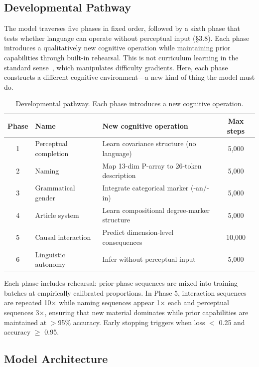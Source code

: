 \documentclass{article}
\begin{document}
\subsection{Developmental Pathway}

The model traverses five phases in fixed order, followed by a sixth phase that tests whether language can operate without perceptual input (\S3.8). Each phase introduces a qualitatively new cognitive operation while maintaining prior capabilities through built-in rehearsal. This is not curriculum learning in the standard sense~\cite{bengio2009}, which manipulates difficulty gradients. Here, each phase constructs a different cognitive environment---a new kind of thing the model must do.

\begin{table}[htbp]
\centering
\small
\begin{tabular}{cllc}
\toprule
Phase & Name & New cognitive operation & Max steps \\
\midrule
1 & Perceptual completion & Learn covariance structure (no language) & 5,000 \\
2 & Naming & Map 13-dim P-array to 26-token description & 5,000 \\
3 & Grammatical gender & Integrate categorical marker (-an/-in) & 5,000 \\
4 & Article system & Learn compositional degree-marker structure & 5,000 \\
5 & Causal interaction & Predict dimension-level consequences & 10,000 \\
6 & Linguistic autonomy & Infer without perceptual input & 5,000 \\
\bottomrule
\end{tabular}
\caption{Developmental pathway. Each phase introduces a new cognitive operation.}
\label{tab:phases}
\end{table}

Each phase includes rehearsal: prior-phase sequences are mixed into training batches at empirically calibrated proportions. In Phase 5, interaction sequences are repeated 10$\times$ while naming sequences appear 1$\times$ each and perceptual sequences 3$\times$, ensuring that new material dominates while prior capabilities are maintained at $>$95\% accuracy. Early stopping triggers when loss $<$ 0.25 and accuracy $\geq$ 0.95.

\subsection{Model Architecture}
\end{document}
